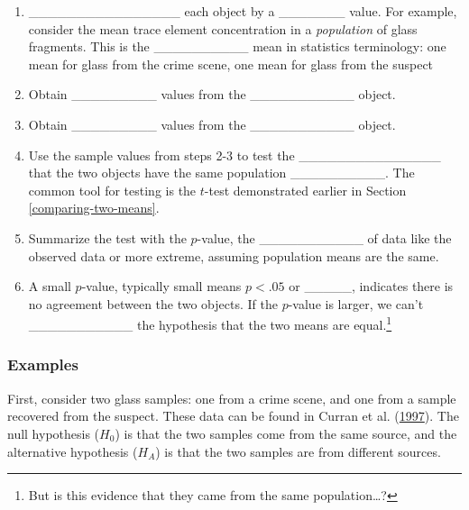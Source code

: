 \documentclass[]{book}
\providecommand{\tightlist}{%
  \setlength{\itemsep}{0pt}\setlength{\parskip}{0pt}}
\let\rmarkdownfootnote\footnote%
\def\footnote{\protect\rmarkdownfootnote}
\theoremstyle{definition}
\theoremstyle{definition}
\theoremstyle{remark}
\begin{document}
\begin{enumerate}
\def\labelenumi{\arabic{enumi}.}
\tightlist
\item
  \_\_\_\_\_\_\_\_\_\_\_\_\_\_\_\_ each object by a \_\_\_\_\_\_\_
  value. For example, consider the mean trace element concentration in a
  \emph{population} of glass fragments. This is the \_\_\_\_\_\_\_\_\_\_
  mean in statistics terminology: one mean for glass from the crime
  scene, one mean for glass from the suspect \vspace{.1in}
\item
  Obtain \_\_\_\_\_\_\_\_\_ values from the \_\_\_\_\_\_\_\_\_\_\_
  object. \vspace{.1in}
\item
  Obtain \_\_\_\_\_\_\_\_\_ values from the \_\_\_\_\_\_\_\_\_\_\_
  object. \vspace{.1in}
\item
  Use the sample values from steps 2-3 to test the
  \_\_\_\_\_\_\_\_\_\_\_\_\_\_\_ that the two objects have the same
  population \_\_\_\_\_\_\_\_\_\_. The common tool for testing is the
  \(t\)-test demonstrated earlier in Section \ref{comparing-two-means}.
  \vspace{.1in}
\item
  Summarize the test with the \(p\)-value, the \_\_\_\_\_\_\_\_\_\_\_ of
  data like the observed data or more extreme, assuming population means
  are the same. \vspace{.1in}
\item
  A small \(p\)-value, typically small means \(p < .05\) or \_\_\_\_\_,
  indicates there is no agreement between the two objects. If the
  \(p\)-value is larger, we can't \_\_\_\_\_\_\_\_\_\_\_ the hypothesis
  that the two means are equal.\footnote{But is this evidence that they
    came from the same population\ldots{}?}
\end{enumerate}

\subsubsection{Examples}\label{examples-4}

First, consider two glass samples: one from a crime scene, and one from
a sample recovered from the suspect. These data can be found in Curran
et al. (\protect\hyperlink{ref-curranetal}{1997}). The null hypothesis
(\(H_0\)) is that the two samples come from the same source, and the
alternative hypothesis (\(H_A\)) is that the two samples are from
different sources.
\end{document}
